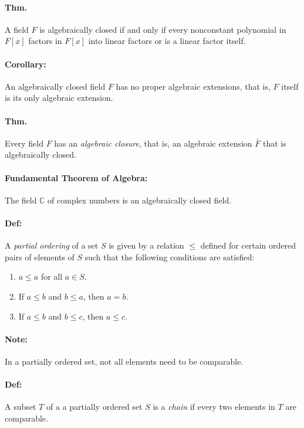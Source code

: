 \documentclass[10pt,a4paper]{article}
\begin{document}
\paragraph{Thm.} A field $F$ is algebraically closed if and only if every nonconstant polynomial in $F[x]$ factors in $F[x]$ into linear factors or is a linear factor itself.

\paragraph{Corollary:} An algebraically closed field $F$ has no proper algebraic extensions, that is, $F$ itself is its only algebraic extension.

\paragraph{Thm.} Every field $F$ has an \textit{algebraic closure}, that is, an algebraic extension $\bar{F}$ that is algebraically closed.

\paragraph{Fundamental Theorem of Algebra:} The field $\mathbb{C}$ of complex numbers is an algebraically closed field.

\paragraph{Def:} A \textit{partial ordering} of a set $S$ is given by a relation $\leq$ defined for certain ordered pairs of elements of $S$ such that the following conditions are satisfied:
\begin{enumerate}
\item $a \leq a$ for all $a \in S$.
\item If $a \leq b$ and $b \leq a$, then $a=b$.
\item If $a \leq b$ and $b \leq c$, then $a \leq c$.
\end{enumerate}

\paragraph{Note:} In a partially ordered set, not all elements need to be comparable.

\paragraph{Def:} A subset $T$ of a a partially ordered set $S$ is a \textit{chain} if every two elements in $T$ are comparable.
\end{document}
